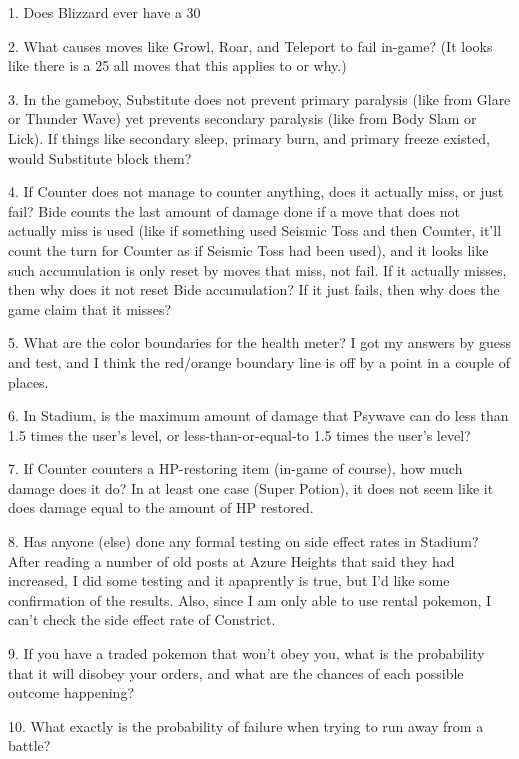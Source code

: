 \documentclass[reprint, aps, prl, paper=A4]{revtex4-1}
\begin{document}
 1. Does Blizzard ever have a 30%

 2. What causes moves like Growl, Roar, and Teleport to fail in-game? (It looks like there is a
    25%
    all moves that this applies to or why.)

 3. In the gameboy, Substitute does not prevent primary paralysis (like from Glare or Thunder
    Wave) yet prevents secondary paralysis (like from Body Slam or Lick). If things like
    secondary sleep, primary burn, and primary freeze existed, would Substitute block them?

 4. If Counter does not manage to counter anything, does it actually miss, or just fail? Bide
    counts the last amount of damage done if a move that does not actually miss is used (like
    if something used Seismic Toss and then Counter, it'll count the turn for Counter as if
    Seismic Toss had been used), and it looks like such accumulation is only reset by moves
    that miss, not fail. If it actually misses, then why does it not reset Bide accumulation?
    If it just fails, then why does the game claim that it misses?

 5. What are the color boundaries for the health meter? I got my answers by guess and test, and
    I think the red/orange boundary line is off by a point in a couple of places.

 6. In Stadium, is the maximum amount of damage that Psywave can do less than 1.5 times the
    user's level, or less-than-or-equal-to 1.5 times the user's level?

 7. If Counter counters a HP-restoring item (in-game of course), how much damage does it do? In
    at least one case (Super Potion), it does not seem like it does damage equal to the amount
    of HP restored.

 8. Has anyone (else) done any formal testing on side effect rates in Stadium? After reading a
    number of old posts at Azure Heights that said they had increased, I did some testing and
    it apaprently is true, but I'd like some confirmation of the results. Also, since I am only
    able to use rental pokemon, I can't check the side effect rate of Constrict.

 9. If you have a traded pokemon that won't obey you, what is the probability that it will
    disobey your orders, and what are the chances of each possible outcome happening?

10. What exactly is the probability of failure when trying to run away from a battle?
\end{document}
